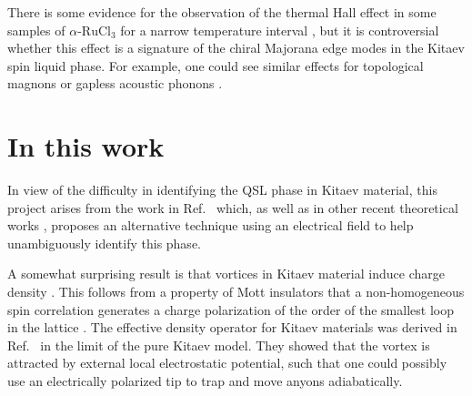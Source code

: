 

There is some evidence for the observation of the thermal Hall effect in some samples of $\alpha\text{-RuCl}_3$  for a narrow temperature interval \cite{Kasahara2018,Motome2020,Yokoi_2021,Ye2018}, but it is controversial whether this effect is a signature of the chiral Majorana edge modes in the Kitaev spin liquid phase. For example, one could see similar effects for topological magnons \cite{Sahasrabudhe_2020,Czajka_2022} or gapless acoustic phonons \cite{Vinkler_Aviv_2018}.








\section*{In this work}

In view of the difficulty in identifying the QSL phase in Kitaev material, this project arises from the work in Ref.~\cite{Pereira2020} which, as well as in other recent theoretical works \cite{Aasen2020,zhang2020electrical}, proposes an alternative technique using an electrical field to help unambiguously identify this phase.



A somewhat surprising result is that vortices in Kitaev material induce charge density \cite{Pereira2020}. This follows from a property of Mott insulators that a non-homogeneous spin correlation generates a charge polarization of the order of the smallest loop in the lattice \cite{Bulaevskii_2008,Khomskii_2010}.  The effective density operator for Kitaev materials was derived in Ref.~\cite{Pereira2020}  %
in the limit of the pure Kitaev model.
They showed that the vortex is attracted by external local electrostatic potential, such that one could possibly use an electrically polarized tip to trap and move anyons adiabatically.




